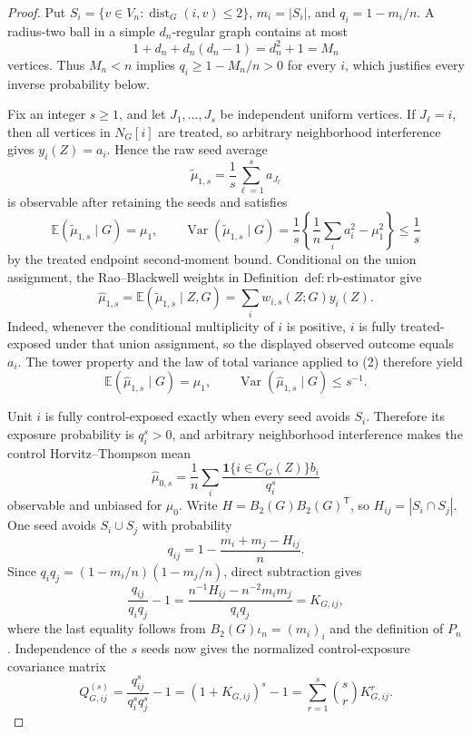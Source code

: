 \documentclass{article}
\begin{document}
\begin{proof}
Put \(S_i=\{v\in V_n:\operatorname{dist}_G(i,v)\le2\}\), \(m_i=|S_i|\), and \(q_i=1-m_i/n\).  A radius-two ball in a simple \(d_n\)-regular graph contains at most
\[
1+d_n+d_n(d_n-1)=d_n^2+1=M_n
\tag{1}
\]
vertices.  Thus \(M_n<n\) implies \(q_i\ge1-M_n/n>0\) for every \(i\), which justifies every inverse probability below.

Fix an integer \(s\ge1\), and let \(J_1,\ldots,J_s\) be independent uniform vertices.  If \(J_\ell=i\), then all vertices in \(N_G[i]\) are treated, so arbitrary neighborhood interference gives \(y_i(Z)=a_i\).  Hence the raw seed average
\[
\widetilde\mu_{1,s}=\frac1s\sum_{\ell=1}^s a_{J_\ell}
\]
is observable after retaining the seeds and satisfies
\[
\mathbb E(\widetilde\mu_{1,s}\mid G)=\mu_1,
\qquad
\operatorname{Var}(\widetilde\mu_{1,s}\mid G)
=\frac1s\left\{\frac1n\sum_i a_i^2-\mu_1^2\right\}\le\frac1s
\tag{2}
\]
by the treated endpoint second-moment bound.  Conditional on the union assignment, the Rao--Blackwell weights in Definition~\(\mathrm{def{:}rb\mbox{-}estimator}\) give
\[
\widehat\mu_{1,s}
=\mathbb E(\widetilde\mu_{1,s}\mid Z,G)
=\sum_i w_{i,s}(Z;G)y_i(Z).
\]
Indeed, whenever the conditional multiplicity of \(i\) is positive, \(i\) is fully treated-exposed under that union assignment, so the displayed observed outcome equals \(a_i\).  The tower property and the law of total variance applied to (2) therefore yield
\[
\mathbb E(\widehat\mu_{1,s}\mid G)=\mu_1,
\qquad
\operatorname{Var}(\widehat\mu_{1,s}\mid G)\le s^{-1}.
\tag{3}
\]

Unit \(i\) is fully control-exposed exactly when every seed avoids \(S_i\).  Therefore its exposure probability is \(q_i^s>0\), and arbitrary neighborhood interference makes the control Horvitz--Thompson mean
\[
\widehat\mu_{0,s}=\frac1n\sum_i
\frac{\mathbf 1\{i\in C_G(Z)\}b_i}{q_i^s}
\]
observable and unbiased for \(\mu_0\).  Write \(H=B_2(G)B_2(G)^{\mathsf T}\), so \(H_{ij}=|S_i\cap S_j|\).  One seed avoids \(S_i\cup S_j\) with probability
\[
q_{ij}=1-\frac{m_i+m_j-H_{ij}}n.
\]
Since \(q_iq_j=(1-m_i/n)(1-m_j/n)\), direct subtraction gives
\[
\frac{q_{ij}}{q_iq_j}-1
=\frac{n^{-1}H_{ij}-n^{-2}m_im_j}{q_iq_j}
=K_{G,ij},
\tag{4}
\]
where the last equality follows from \(B_2(G)\iota_n=(m_i)_i\) and the definition of \(P_n\).  Independence of the \(s\) seeds now gives the normalized control-exposure covariance matrix
\[
Q^{(s)}_{G,ij}
=\frac{q_{ij}^s}{q_i^sq_j^s}-1
=(1+K_{G,ij})^s-1
=\sum_{r=1}^s\binom sr K_{G,ij}^r.
\tag{5}
\]


\end{proof}
\end{document}

